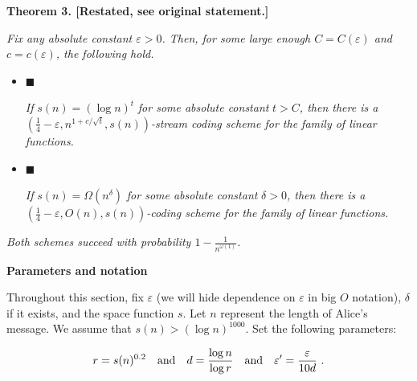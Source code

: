 \par\medskip\noindent\textbf{
\textbf{Theorem 3}\textbf{.}
[Restated, see original statement.]}\par



\emph{Fix any absolute constant $\varepsilon>0$. Then, for some large enough
$C=C(\varepsilon)$ and $c=c(\varepsilon)$, the following hold.}\par


\begin{itemize}


\item[] 
$\blacksquare$ 


\emph{If }$s(n)=(\log n)^{t}$\emph{ for some absolute constant }$t>C$\emph{, then there is a }$\left(\frac{1}{4}-\varepsilon,n^{1+c/\sqrt{t}},s(n)\right)$\emph{-stream coding scheme for the family of linear functions.}\par





\item[] 
$\blacksquare$ 


\emph{If }$s(n)=\Omega(n^{\delta})$\emph{ for some absolute constant }$\delta>0$\emph{, then there is a }$\left(\frac{1}{4}-\varepsilon,O(n),s(n)\right)$\emph{-coding scheme for the family of linear functions.}\par





\end{itemize}


\emph{Both schemes succeed with probability $1-\frac{1}{n^{\omega(1)}}$.}\par







\par\medskip\noindent\textbf{Parameters and notation}\par




Throughout this section, fix $\varepsilon$ (we will hide dependence on $\varepsilon$ in big $O$ notation), $\delta$ if it exists, and the space function $s$. Let $n$ represent the length of Alice’s message.
We assume that $s(n)>(\log n)^{1000}$. Set the following parameters:\par


\[\begin{gathered}
r=s(n)^{0.2}\quad\text{and}\quad d=\frac{\log n}{\log r}\quad\text{and}\quad\varepsilon^{\prime}=\frac{\varepsilon}{10d}\nobreak\ .
\end{gathered}\]


